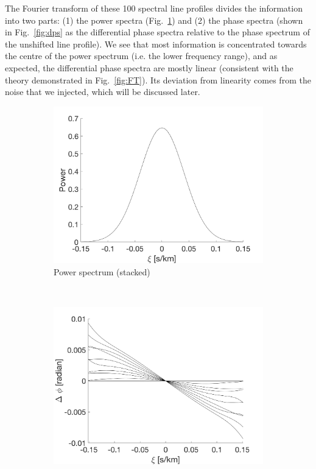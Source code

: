 The Fourier transform of these 100 spectral line profiles divides the information into two parts: (1) the power spectra (Fig.~\ref{fig:power_spectrum}) and (2) the phase spectra (shown in Fig.~\ref{fig:dps} as the differential phase spectra relative to the phase spectrum of the unshifted line profile). We see that most information is concentrated towards the centre of the power spectrum (i.e. the lower frequency range), and as expected, the differential phase spectra are mostly linear (consistent with the theory demonstrated in Fig.~\ref{fig:FT}). Its deviation from linearity comes from the noise that we injected, which will be discussed later. 

\begin{figure}[tbp]	
    \begin{subfigure}[b]{0.49\textwidth}
        \includegraphics[width=\textwidth]{./Figures/Methods/2-FT_power.png}
        \caption{Power spectrum (stacked)}
        \label{fig:power_spectrum}
    \end{subfigure}
	~
    \begin{subfigure}[b]{0.49\textwidth}
        \includegraphics[width=\textwidth]{./Figures/Methods/4-Relative_phase_angle.png}

\end{subfigure}
\end{figure}

